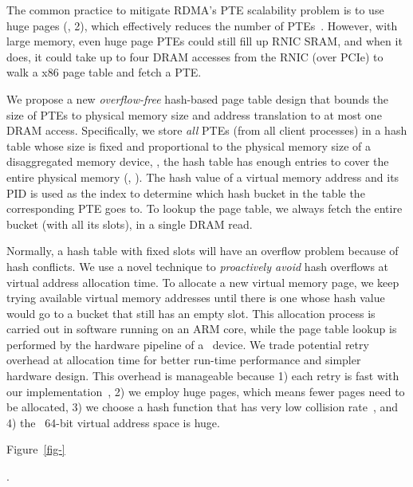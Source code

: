 The common practice to mitigate RDMA's PTE scalability problem is to use huge pages (\eg, 2\GB),
which effectively reduces the number of PTEs~\cite{FaRM,Tsai17-SOSP,XXX}.
However, with large memory, even huge page PTEs could still fill up RNIC SRAM, 
and when it does, it could take up to four DRAM accesses from the RNIC (over PCIe) to walk a x86 page table and fetch a PTE.

We propose a new {\em overflow-free} hash-based page table design that bounds the size of PTEs to physical memory size 
and address translation to at most one DRAM access.
Specifically, we store {\em all} PTEs (from all client processes) in a hash table 
whose size is fixed and proportional to the physical memory size of a disaggregated memory device,
\ie, the hash table has enough entries to cover the entire physical memory (\eg, ).
The hash value of a virtual memory address and its PID is used as the index to determine which hash bucket in the table the corresponding PTE goes to.
To lookup the page table, we always fetch
the entire bucket (with all its slots), in a single DRAM read.

Normally, a hash table with fixed slots will have an overflow problem because of hash conflicts.
We use a novel technique to {\em proactively avoid} hash overflows at virtual address allocation time.
To allocate a new virtual memory page, we keep trying available virtual memory addresses until there is one 
whose hash value would go to a bucket that still has an empty slot.
This allocation process is carried out in software running on an ARM core, while the page table lookup is performed by the hardware pipeline of a \sys\ device.
We trade potential retry overhead at allocation time for better run-time performance and simpler hardware design.
This overhead is manageable because 1) each retry is fast with our implementation~\cite{sec:metadataplane}, 
2) we employ huge pages, which means fewer pages need to be allocated, 
3) we choose a hash function that has very low collision rate~\cite{lookup3-wiki},
and 4) the \sys\ 64-bit virtual address space is huge.

Figure~\ref{fig-} 

\textit{}.

